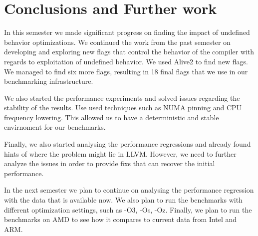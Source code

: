 \section{Conclusions and Further work}

In this semester we made significant progress on finding the impact of undefined
behavior optimizations. We continued the work from the past semester on
developing and exploring new flags that control the behavior of the compiler
with regards to exploitation of undefined behavior. We used Alive2 to find new
flags. We managed to find six more flags, resulting in 18 final flags that we
use in our benchmarking infrastructure.

We also started the performance experiments and solved issues regarding the
stability of the results. Use used techniques such as NUMA pinning and CPU
frequency lowering. This allowed us to have a deterministic and stable
envirnoment for our benchmarks.

Finally, we also started analysing the performance regressions and already found
hints of where the problem might lie in LLVM. However, we need to further analyze
the issues in order to provide fixs that can recover the initial performance.

In the next semester we plan to continue on analysing the performance regression
with the data that is available now. We also plan to run the benchmarks with
different optimization settings, such as -O3, -Os, -Oz. Finally, we plan to run
the benchmarks on AMD to see how it compares to current data from Intel and ARM.
